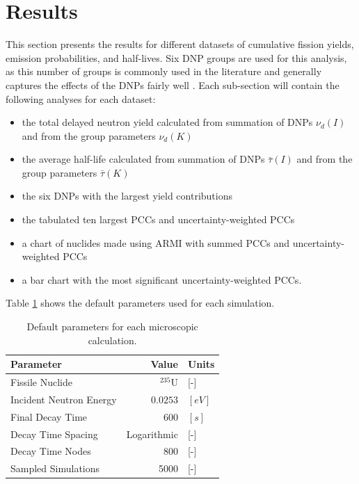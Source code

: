 \documentclass[hidelinks]{style/nseJournal}
\begin{document}
\FloatBarrier


\section{Results}
This section presents the results for different datasets of cumulative fission yields, emission probabilities, and half-lives.
Six \gls{DNP} groups are used for this analysis, as this number of groups is commonly used in the literature and generally captures the effects of the \glspl{DNP} fairly well \cite{brady1989delayed}.
Each sub-section will contain the following analyses for each dataset:
\begin{itemize}
    \item the total delayed neutron yield calculated from summation of \glspl{DNP} $\nu_d(I)$ and from the group parameters $\nu_d(K)$
    \item the average half-life calculated from summation of \glspl{DNP} $\bar{\tau}(I)$ and from the group parameters $\bar{\tau}(K)$
    \item the six \glspl{DNP} with the largest yield contributions
    \item the tabulated ten largest \glspl{PCC} and uncertainty-weighted \glspl{PCC}
    \item a chart of nuclides made using \gls{ARMI} with summed \glspl{PCC} and uncertainty-weighted \glspl{PCC} \cite{armi}
    \item a bar chart with the most significant uncertainty-weighted \glspl{PCC}.
\end{itemize}
Table \ref{tab:default-params} shows the default parameters used for each simulation.


\begin{table}[H]
    \centering
    \caption{Default parameters for each microscopic calculation.}
    \begin{tabular}{lrl}
        \hline
        Parameter & Value & Units\\
        \hline
        \rule{0pt}{2ex}\vspace{0.1 mm}Fissile Nuclide & \vspace{0.1 mm}$^{235}$U & [-]\\
        Incident Neutron Energy & $0.0253$ &$ [eV]$\\
        Final Decay Time & $600$ & $[s]$\\
        Decay Time Spacing & Logarithmic & [-]\\
        Decay Time Nodes & 800 & [-]\\
        Sampled Simulations & 5000 & [-]\\
        \hline
    \end{tabular}
    \label{tab:default-params}
\end{table}
\end{document}
